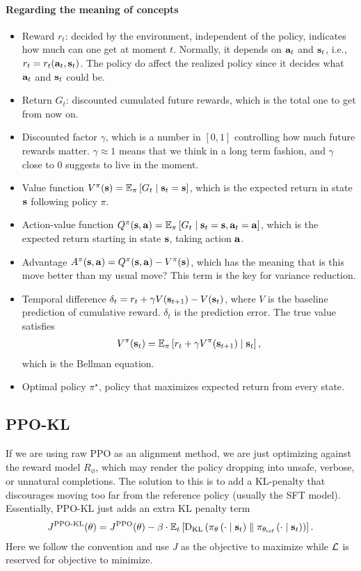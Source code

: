 \documentclass[11pt]{article}  %
\begin{document}
\paragraph{Regarding the meaning of concepts}
\begin{itemize}
  \item Reward $r_t$: decided by the environment, independent of the policy, indicates how much can one get at moment $t$. 
  Normally, it depends on $\mathbf{a}_t$ and $\mathbf{s}_t$, i.e., $r_t = r_t(\mathbf{a}_t, \mathbf{s}_t)$.
  The policy do affect the realized policy since it decides what $\mathbf{a}_t$ and $\mathbf{s}_t$ could be.
  \item Return $G_t$: discounted cumulated future rewards, which is the total one to get from now on.
  \item Discounted factor $\gamma$, which is a number in $[0, 1]$ controlling how much future rewards matter. 
  $\gamma \approx 1$ means that we think in a long term fashion, and $\gamma$ close to $0$ suggests to live in the moment.
  \item Value function $V^{\pi}(\mathbf{s}) = \mathbb{E}_{\pi}\left[G_t \mid \mathbf{s}_t = \mathbf{s}\right]$, which is the expected return in state $\mathbf{s}$ following policy $\pi$.
  \item Action-value function $Q^{\pi}(\mathbf{s}, \mathbf{a}) = \mathbb{E}_{\pi}\left[G_t \mid \mathbf{s}_t = \mathbf{s}, \mathbf{a}_t = \mathbf{a}\right]$, which is the expected return starting in state $\mathbf{s}$, taking action $\mathbf{a}$.
  \item Advantage $A^{\pi}(\mathbf{s}, \mathbf{a}) = Q^{\pi}(\mathbf{s}, \mathbf{a}) - V^{\pi}(\mathbf{s})$, which has the meaning that is this move better than my usual move? This term is the key for variance reduction.
  \item Temporal difference $\delta_t = r_t + \gamma V(\mathbf{s}_{t+1}) - V(\mathbf{s}_t)$, where $V$ is the baseline prediction of cumulative reward. 
  $\delta_t$ is the prediction error. 
  The true value satisfies 
  \begin{align*}
    V^{\pi}(\mathbf{s}_t) = \mathbb{E}_{\pi}\left[r_t + \gamma V^{\pi}(\mathbf{s}_{t+1})\mid \mathbf{s}_t\right],
  \end{align*}
  which is the Bellman equation.
  \item Optimal policy $\pi^\star$, policy that maximizes expected return from every state.
\end{itemize}




\subsection{PPO-KL}
If we are using raw PPO as an alignment method, we are just optimizing against the reward model $R_{\phi}$, which may render the policy dropping into unsafe, verbose, or unnatural completions.
The solution to this is to add a KL-penalty that discourages moving too far from the reference policy (usually the SFT model).
Essentially, PPO-KL just adds an extra KL penalty term 
\begin{align*}
  J^{\text{PPO-KL}}(\theta) = J^{\text{PPO}}(\theta) - \beta\cdot\mathbb{E}_{t}\left[{\rm D}_{\text{KL}}\left( \pi_{\theta}\left( \cdot \mid \mathbf{s}_t \right) \parallel \pi_{\theta_{\text{ref}}}\left( \cdot \mid \mathbf{s}_t \right) \right)\right].
\end{align*}
Here we follow the convention and use $J$ as the objective to maximize while $\mathcal{L}$ is reserved for objective to minimize.
\end{document}
